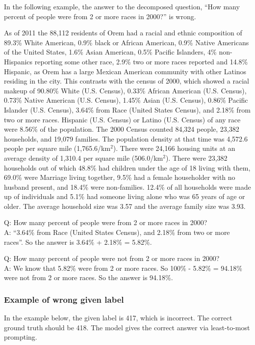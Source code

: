In the following example, the answer to the decomposed question, ``How many percent of people were from 2 or more races in 2000?'' is wrong.

As of 2011 the 88,112 residents of Orem had a racial and ethnic composition of 89.3\% White American, 0.9\% black or African American, 0.9\% Native Americans of the United States, 1.6\% Asian American, 0.5\% Pacific Islanders, 4\% non-Hispanics reporting some other race, 2.9\% two or more races reported and 14.8\% Hispanic, as Orem has a large Mexican American community with other Latinos residing in the city. This contrasts with the census of 2000, which showed a racial makeup of 90.80\% White (U.S. Census), 0.33\% African American (U.S. Census), 0.73\% Native American (U.S. Census), 1.45\% Asian (U.S. Census), 0.86\% Pacific Islander (U.S. Census), 3.64\% from Race (United States Census), and 2.18\% from two or more races. Hispanic (U.S. Census) or Latino (U.S. Census) of any race were 8.56\% of the population. The 2000 Census counted 84,324 people, 23,382 households, and 19,079 families. The population density at that time was 4,572.6 people per square mile (1,765.6/km$^2$). There were 24,166 housing units at an average density of 1,310.4 per square mile (506.0/km$^2$). There were 23,382 households out of which 48.8\% had children under the age of 18 living with them, 69.0\% were Marriage living together, 9.5\% had a female householder with no husband present, and 18.4\% were non-families. 12.4\% of all households were made up of individuals and 5.1\% had someone living alone who was 65 years of age or older. The average household size was 3.57 and the average family size was 3.93.

Q: How many percent of people were from 2 or more races in 2000?\\
A: ``3.64\% from Race (United States Census), and 2.18\% from two or more races''. So the answer is 3.64\% + 2.18\% = 5.82\%.

Q: How many percent of people were not from 2 or more races in 2000?\\
A: We know that 5.82\% were from 2 or more races. So 100\% - 5.82\% = 94.18\% were not from 2 or more races. So the answer is 94.18\%.

\subsubsection{Example of wrong given label}

In the example below, the given label is 417, which is incorrect. The correct ground truth should be 418. The model gives the correct answer via least-to-most prompting.

